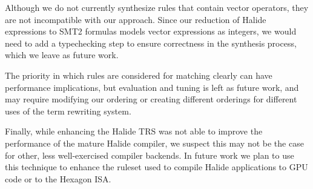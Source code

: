 Although we do not currently synthesize rules that contain vector operators,
they are not incompatible with our approach. Since our reduction of Halide
expressions to SMT2 formulas models vector expressions as integers, we would need
to add a typechecking step to ensure correctness in the synthesis process, which
we leave as future work.

The priority in which rules are considered for matching clearly can have
performance implications, but evaluation and tuning is left as future work, and
may require modifying our ordering or creating different orderings for different
uses of the term rewriting system.

Finally, while enhancing the Halide TRS was not able to improve the performance of the mature Halide compiler, we suspect this may not be the case for other, less well-exercised compiler backends. In future work we plan to use this technique to enhance the ruleset used to compile Halide applications to GPU code or to the Hexagon ISA.